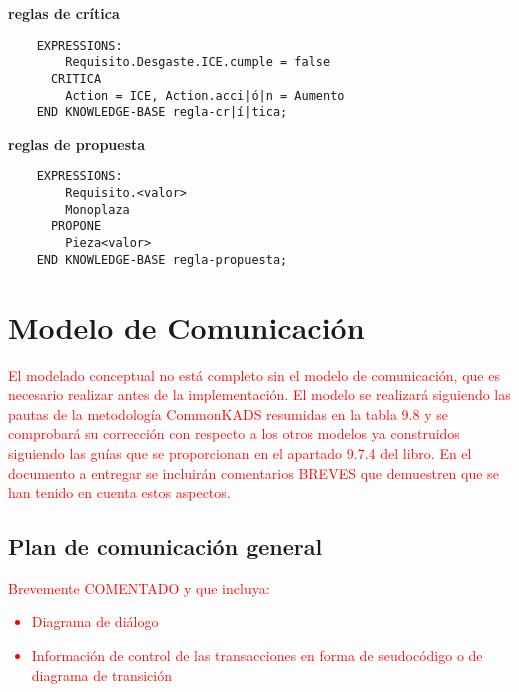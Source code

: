 \documentclass[12pt,a4paper,twoside,spanish]{article}      %
\begin{document}
\textbf{reglas de crítica}
\begin{lstlisting}
    EXPRESSIONS:
        Requisito.Desgaste.ICE.cumple = false
      CRITICA
        Action = ICE, Action.acci|ó|n = Aumento
    END KNOWLEDGE-BASE regla-cr|í|tica;
\end{lstlisting}

\textbf{reglas de propuesta}
\begin{lstlisting}
    EXPRESSIONS:
        Requisito.<valor>
        Monoplaza
      PROPONE
        Pieza<valor>
    END KNOWLEDGE-BASE regla-propuesta;
\end{lstlisting}

\section{Modelo de Comunicación}

\textcolor {red} {El modelado conceptual no está completo sin el modelo de comunicación, que es necesario realizar antes de la implementación. El modelo se realizará siguiendo las pautas de la metodología CommonKADS resumidas en la tabla 9.8 y se comprobará su corrección con respecto a los otros modelos ya construidos siguiendo las guías que se proporcionan en el apartado 9.7.4 del libro. En el documento a entregar se incluirán comentarios BREVES que demuestren que se han tenido en cuenta estos aspectos.}

\subsection{Plan de comunicación general}

\textcolor {red}
{
Brevemente COMENTADO y que incluya:
\begin{itemize}
 \item Diagrama de diálogo
 \item Información de control de las transacciones en forma de
seudocódigo o de diagrama de transición
\end{itemize}
}

\end{document}
